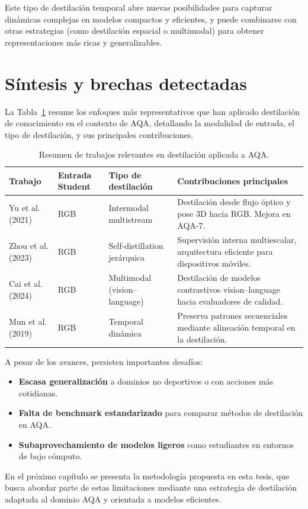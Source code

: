 Este tipo de destilación temporal abre nuevas posibilidades para capturar dinámicas complejas en modelos compactos y eficientes, y puede combinarse con otras estrategias (como destilación espacial o multimodal) para obtener representaciones más ricas y generalizables.


\section{Síntesis y brechas detectadas}

La Tabla~\ref{tab:aqa_kd_summary} resume los enfoques más representativos que han aplicado destilación de conocimiento en el contexto de AQA, detallando la modalidad de entrada, el tipo de destilación, y sus principales contribuciones.

\begin{table}[ht]
    \centering
    \caption{Resumen de trabajos relevantes en destilación aplicada a AQA.}
    \label{tab:aqa_kd_summary}
    \begin{tabular}{|p{3.5cm}|p{2.2cm}|p{2.8cm}|p{4.2cm}|}
    \hline
    \textbf{Trabajo} & \textbf{Entrada Student} & \textbf{Tipo de destilación} & \textbf{Contribuciones principales} \\
    \hline
    Yu et al. (2021) & RGB & Intermodal multistream & Destilación desde flujo óptico y pose 3D hacia RGB. Mejora en AQA-7. \\
    \hline
    Zhou et al. (2023) & RGB & Self-distillation jerárquica & Supervisión interna multiescalar, arquitectura eficiente para dispositivos móviles. \\
    \hline
    Cai et al. (2024) & RGB & Multimodal (vision–language) & Destilación de modelos contrastivos vision–language hacia evaluadores de calidad. \\
    \hline
    Mun et al. (2019) & RGB & Temporal dinámica & Preserva patrones secuenciales mediante alineación temporal en la destilación. \\
    \hline
    \end{tabular}
\end{table}

A pesar de los avances, persisten importantes desafíos:

\begin{itemize}
  \item \textbf{Escasa generalización} a dominios no deportivos o con acciones más cotidianas.
  \item \textbf{Falta de benchmark estandarizado} para comparar métodos de destilación en AQA.
  \item \textbf{Subaprovechamiento de modelos ligeros} como estudiantes en entornos de bajo cómputo.
\end{itemize}

En el próximo capítulo se presenta la metodología propuesta en esta tesis, que busca abordar parte de estas limitaciones mediante una estrategia de destilación adaptada al dominio AQA y orientada a modelos eficientes.
